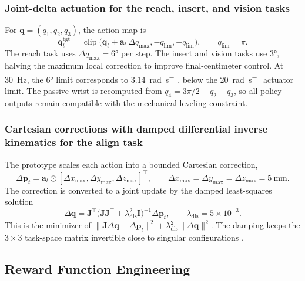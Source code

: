 \subsubsection{Joint-delta actuation for the reach, insert, and vision tasks}

For $\bm{q}=(q_1,q_2,q_3)$, the action map is
\begin{equation}
\bm q^{\text{tgt}}_t = \operatorname{clip}\!\big(\bm q_t + \bm a_t\,\Delta q_{\max},-q_{\lim},+q_{\lim}\big),
\qquad q_{\lim}=\pi .
\label{rl:eq:rl-act-joint}
\end{equation}
The reach task uses $\Delta q_{\max}=\ang{6}$ per step. The insert and vision tasks use \ang{3}, halving the maximum local correction to improve final-centimeter control. At \SI{30}{\hertz}, the \ang{6} limit corresponds to \SI{3.14}{\radian\per\second}, below the \SI{20}{\radian\per\second} actuator limit. The passive wrist is recomputed from $q_4=3\pi/2-q_2-q_3$, so all policy outputs remain compatible with the mechanical leveling constraint.

\subsubsection{Cartesian corrections with damped differential inverse kinematics for the align task}

The prototype scales each action into a bounded Cartesian correction,
\begin{equation}
\Delta\bm p_t=\bm a_t\odot[\Delta x_{\max},\Delta y_{\max},\Delta z_{\max}]^{\top},
\qquad \Delta x_{\max}=\Delta y_{\max}=\Delta z_{\max}=\SI{5}{\milli\meter}.
\label{rl:eq:rl-act-cart}
\end{equation}
The correction is converted to a joint update by the damped least-squares solution
\begin{equation}
\Delta\bm q=\bm J^{\top}\big(\bm J\bm J^{\top}+\lambda_{\mathrm{dls}}^2\bm I\big)^{-1}\Delta\bm p_t,
\qquad \lambda_{\mathrm{dls}}=5\times10^{-3}.
\label{rl:eq:rl-dls}
\end{equation}
This is the minimizer of $\lVert\bm J\Delta\bm q-\Delta\bm p_t\rVert^2+\lambda_{\mathrm{dls}}^2\lVert\Delta\bm q\rVert^2$. The damping keeps the $3\times3$ task-space matrix invertible close to singular configurations \cite{wampler_1986_dls,nakamura_1986_singularity}.

\rlFloatBarrier

\subsection{Reward Function Engineering}\label{rl:sec:rl-reward}

